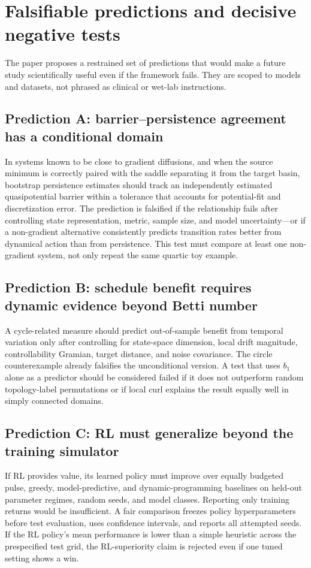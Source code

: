 \documentclass[11pt]{article}
\newcommand{\1}{\mathbf{1}}
\begin{document}
\section{Falsifiable predictions and decisive negative tests}
The paper proposes a restrained set of predictions that would make a future study scientifically useful even if the framework fails. They are scoped to models and datasets, not phrased as clinical or wet-lab instructions.

\subsection{Prediction A: barrier--persistence agreement has a conditional domain}
In systems known to be close to gradient diffusions, and when the source minimum is correctly paired with the saddle separating it from the target basin, bootstrap persistence estimates should track an independently estimated quasipotential barrier within a tolerance that accounts for potential-fit and discretization error. The prediction is falsified if the relationship fails after controlling state representation, metric, sample size, and model uncertainty—or if a non-gradient alternative consistently predicts transition rates better from dynamical action than from persistence. This test must compare at least one non-gradient system, not only repeat the same quartic toy example.

\subsection{Prediction B: schedule benefit requires dynamic evidence beyond Betti number}
A cycle-related measure should predict out-of-sample benefit from temporal variation only after controlling for state-space dimension, local drift magnitude, controllability Gramian, target distance, and noise covariance. The circle counterexample already falsifies the unconditional version. A test that uses $b_1$ alone as a predictor should be considered failed if it does not outperform random topology-label permutations or if local curl explains the result equally well in simply connected domains.

\subsection{Prediction C: RL must generalize beyond the training simulator}
If RL provides value, its learned policy must improve over equally budgeted pulse, greedy, model-predictive, and dynamic-programming baselines on held-out parameter regimes, random seeds, and model classes. Reporting only training returns would be insufficient. A fair comparison freezes policy hyperparameters before test evaluation, uses confidence intervals, and reports all attempted seeds. If the RL policy's mean performance is lower than a simple heuristic across the prespecified test grid, the RL-superiority claim is rejected even if one tuned setting shows a win.
\end{document}
